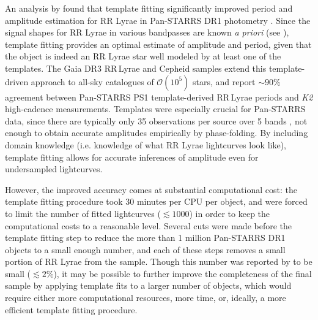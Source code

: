 \documentclass[apj]{emulateapj}
\newcommand{\bigO}{\mathcal{O}}
\begin{document}
An analysis by \cite{Sesar_etal_2016} found that template fitting significantly improved
period and amplitude estimation for RR Lyrae in Pan-STARRS DR1 photometry \citep{PanSTARRS}. Since the signal
shapes for RR Lyrae in various bandpasses are known \emph{a priori} (see \cite{Sesar_etal_2010}),
template fitting provides an optimal estimate of amplitude and period,
given that the object is indeed an RR Lyrae star well modeled by at least one of the templates. The Gaia DR3 RR\,Lyrae and Cepheid samples \citep{Clementini_etal_2023,Ripepi_etal_2023} extend this template-driven approach to all-sky catalogues of $\bigO(10^5)$ stars, and \citet{Forro_etal_2024} report $\sim 90\%$ agreement between Pan-STARRS PS1 template-derived RR\,Lyrae periods and \emph{K2} high-cadence measurements.
Templates were especially crucial for Pan-STARRS data, since there are typically only
35 observations per source over 5 bands \citep{Hernitschek_etal_2016}, not enough to obtain
accurate amplitudes empirically by phase-folding. By including domain knowledge (i.e. knowledge of what RR Lyrae
lightcurves look like), template fitting allows for accurate inferences of amplitude even
for undersampled lightcurves.

However, the improved accuracy comes at substantial computational cost: the template fitting
procedure took 30 minutes per CPU per object, and \cite{Sesar_etal_2016} were forced to limit
the number of fitted lightcurves ($\lesssim 1000$) in order to keep the computational costs
to a reasonable level. Several cuts were made before the template fitting step to reduce the
more than 1 million Pan-STARRS DR1 objects to a small enough number, and each of these steps
removes a small portion of RR Lyrae from the sample. Though this number was reported by
\cite{Sesar_etal_2016} to be small ($\lesssim 2\%$), it may be possible to further improve
the completeness of the final sample by applying template fits to a larger number of objects,
which would require either more computational resources, more time, or, ideally, a more efficient
template fitting procedure.
\end{document}
